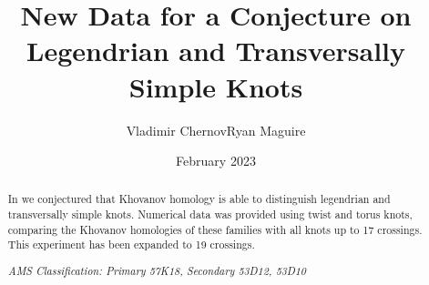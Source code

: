 \documentclass{article}
\title{New Data for a Conjecture on Legendrian and Transversally Simple Knots}
\author{Vladimir Chernov\hspace{2em}Ryan Maguire}
\date{February 2023}
\theoremstyle{plain}
\begin{document}
    \maketitle
    \tableofcontents
    \begin{abstract}
        \noindent
        In \cite{ChernovMaguireLegendrianConjecture} we conjectured that
        Khovanov homology is able to distinguish legendrian and transversally
        simple knots. Numerical data was provided using twist and torus knots,
        comparing the Khovanov homologies of these families with all knots up
        to 17 crossings. This experiment has been expanded to 19 crossings.
        \par\hfill\par
        \textit{AMS Classification: Primary 57K18, Secondary 53D12, 53D10}
    \end{abstract}
\end{document}
